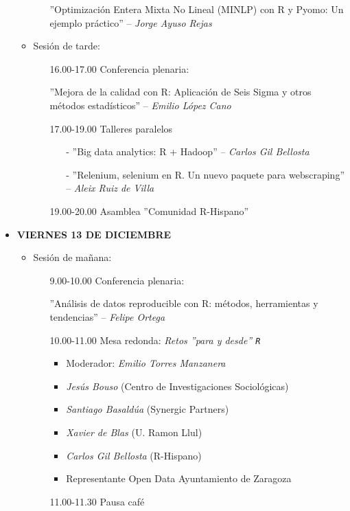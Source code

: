 \begin{itemize}
\begin{itemize}
\begin{itemize}
    ''Optimización Entera Mixta No Lineal (MINLP) con R y Pyomo: Un ejemplo 
    práctico'' -- \emph{Jorge Ayuso Rejas}    
  \end{itemize}
  \item Sesión de tarde:
    \begin{itemize}
      \item[]16.00-17.00 Conferencia plenaria:
    
      ''Mejora de la calidad con R: Aplicación de Seis Sigma y otros 
      métodos estadísticos'' -- \emph{Emilio López Cano}
      \item[] 17.00-19.00 Talleres paralelos
      \begin{enumerate}
      \item[-] ''Big data analytics: R + Hadoop'' -- \emph{Carlos Gil Bellosta}
      \item[-] ''Relenium, selenium en R. Un nuevo paquete para webscraping''
       -- \emph{Aleix Ruiz de Villa}
      \end{enumerate}
      \item[]19.00-20.00 Asamblea ''Comunidad R-Hispano''
    \end{itemize}
  
\end{itemize}
 

 

\item \textsc{\textbf{VIERNES 13 DE DICIEMBRE}}
  \begin{itemize}
  \item Sesión de mañana:
    \begin{itemize}
    \item[] 9.00-10.00  Conferencia plenaria: 

    ''Análisis de datos reproducible con R: métodos, herramientas y tendencias''     -- \emph{Felipe Ortega}

    \item[] 10.00-11.00 Mesa redonda: \textsl{Retos ''para y desde'' \texttt{R}}
      \begin{itemize}
      \item Moderador: \emph{Emilio Torres Manzanera}
      \item \emph{Jesús Bouso} (Centro de Investigaciones Sociológicas)
      \item \emph{Santiago Basaldúa} (Synergic Partners)
      \item \emph{Xavier de Blas} (U. Ramon Llul)
      \item \emph{Carlos Gil Bellosta} (R-Hispano)
      \item Representante Open Data Ayuntamiento de Zaragoza
      \end{itemize}
    \item[]11.00-11.30 Pausa café
 

\end{itemize}
\end{itemize}
\end{itemize}
